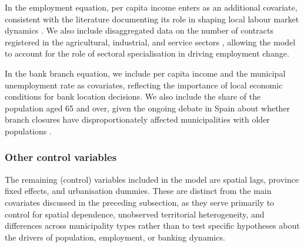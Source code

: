 \documentclass[a4paper,11pt,oneside]{article}
\begin{document}
In the employment equation, per capita income enters as an additional covariate, consistent with the literature documenting its role in shaping local labour market dynamics \citep{carlino1987determinants,hoogstra2017jobs,nguyen2019credit,hasan2019economic}. We also include disaggregated data on the number of contracts registered in the agricultural, industrial, and service sectors \citep{de2012regional,de2012sectoral}, allowing the model to account for the role of sectoral specialisation in driving employment change.

In the bank branch equation, we include per capita income \citep{hegerty2016commercial,nguyen2019credit,hegerty2020banking} and the municipal unemployment rate \citep{hegerty2016commercial,hasan2019economic} as covariates, reflecting the importance of local economic conditions for bank location decisions. We also include the share of the population aged 65 and over, given the ongoing debate in Spain about whether branch closures have disproportionately affected municipalities with older populations \citep[see, for instance,][]{hegerty2016commercial,hegerty2020banking}.




\subsubsection{Other control variables}
\label{sec:other_control_variables}








The remaining (control) variables included in the model are spatial lags, province fixed effects, and urbanisation dummies. These are distinct from the main covariates discussed in the preceding subsection, as they serve primarily to control for spatial dependence, unobserved territorial heterogeneity, and differences across municipality types rather than to test specific hypotheses about the drivers of population, employment, or banking dynamics.
\end{document}
